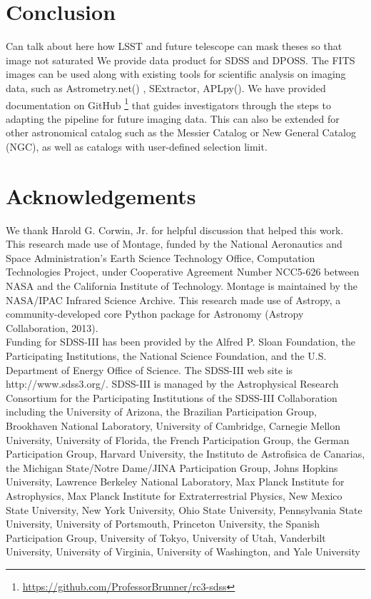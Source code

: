 \documentclass[5p]{elsarticle}
\begin{document}
 \section{Conclusion}
Can talk about here how LSST and future telescope can mask theses so that image not saturated
We provide data product for SDSS and DPOSS.
The FITS images can be used along with existing tools for scientific analysis on imaging data, such as Astrometry.net(\citet{astrometry.net}) , SExtractor, APLpy(\citet{aplpy}). We have provided documentation on GitHub \footnote{\url{https://github.com/ProfessorBrunner/rc3-sdss}} that guides investigators through the steps to adapting the pipeline for future imaging data. This can also be extended for other astronomical catalog such as the Messier Catalog or New General Catalog (NGC), as well as catalogs with user-defined selection limit. %

\section*{Acknowledgements}
\footnotesize
\indent We thank Harold G. Corwin, Jr. for helpful discussion that helped this work. This research made use of Montage, funded by the National Aeronautics and Space Administration's Earth Science Technology Office, Computation Technologies Project, under Cooperative Agreement Number NCC5-626 between NASA and the California Institute of Technology. Montage is maintained by the NASA/IPAC Infrared Science Archive. This research made use of Astropy, a community-developed core Python package for Astronomy (Astropy Collaboration, 2013).
\\
\indent  Funding for SDSS-III has been provided by the Alfred P. Sloan Foundation, the Participating Institutions, the National Science Foundation, and the U.S. Department of Energy Office of Science. The SDSS-III web site is http://www.sdss3.org/. SDSS-III is managed by the Astrophysical Research Consortium for the Participating Institutions of the SDSS-III Collaboration including the University of Arizona, the Brazilian Participation Group, Brookhaven National Laboratory, University of Cambridge, Carnegie Mellon University, University of Florida, the French Participation Group, the German Participation Group, Harvard University, the Instituto de Astrofisica de Canarias, the Michigan State/Notre Dame/JINA Participation Group, Johns Hopkins University, Lawrence Berkeley National Laboratory, Max Planck Institute for Astrophysics, Max Planck Institute for Extraterrestrial Physics, New Mexico State University, New York University, Ohio State University, Pennsylvania State University, University of Portsmouth, Princeton University, the Spanish Participation Group, University of Tokyo, University of Utah, Vanderbilt University, University of Virginia, University of Washington, and Yale University


 
\end{document}
